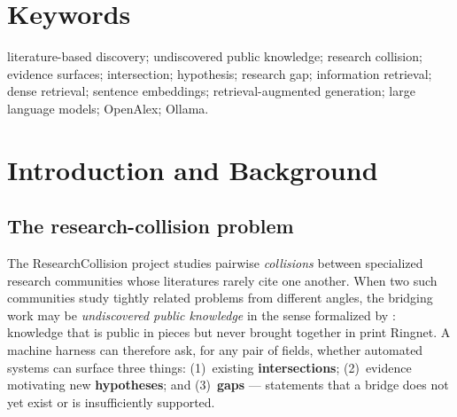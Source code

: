 \documentclass[11pt]{article}
\begin{document}
\begin{abstract}
Because these four cases are \textbf{missing, not empty}, all \texttt{pipeline}
counts (N=58, covering 8 cases) are \textbf{not directly comparable} with the
other systems' 12-case totals. We therefore \textbf{do not rank the systems and
draw no comparative inference}; every quantity in this report is presented as an
observed count, and every claim is traceable to \texttt{results.json} line-for-line
(see \texttt{AUDIT.md} for the claim-by-claim check).

\textbf{Reproducibility:} one experiment, one run, seed \texttt{0}, real Ollama
(remote, OpenAI-compatible) as the LLM provider, real OpenAlex as the scholarly
corpus (DOI-verified retrieval). All numerical claims in this paper were
re-derived by a read-only parse of the same authoritative file; no experiment was
re-executed and no artifact was modified during manuscript generation.
\end{abstract}

\section{Keywords}
\noindent
literature-based discovery; undiscovered public knowledge; research collision;
evidence surfaces; intersection; hypothesis; research gap; information
retrieval; dense retrieval; sentence embeddings; retrieval-augmented generation;
large language models; OpenAlex; Ollama.

\section{Introduction and Background}
\label{sec:intro}

\subsection{The research-collision problem}
The ResearchCollision project studies pairwise \emph{collisions} between
specialized research communities whose literatures rarely cite one another. When
two such communities study tightly related problems from different angles, the
bridging work may be \emph{undiscovered public knowledge} in the sense formalized
by \citet{swanson1986, swanson1997}: knowledge that is public in pieces but never
brought together in print Ringnet. A machine harness can therefore ask, for any
pair of fields, whether automated systems can surface three things:
(1)~existing \textbf{intersections}; (2)~evidence motivating new
\textbf{hypotheses}; and (3)~\textbf{gaps} --- statements that a bridge does not
yet exist or is insufficiently supported.
\end{document}
